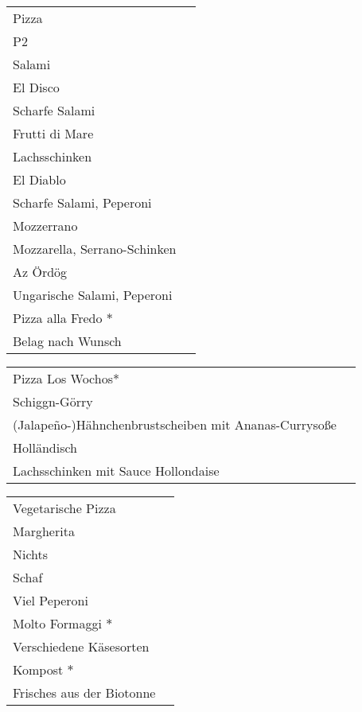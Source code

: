 \documentclass[12pt]{article}
\makeatletter
\newcommand*\ColText[1]{\textcolor{Goldenrod3}{#1}}
\newenvironment{Group}[1]
  {\noindent\begin{tabular*}{\textwidth}{@{}p{.8\linewidth}@{\extracolsep{\fill}}r@{}}
    {\fontsize{24}{29}\selectfont\ColText{#1}}\\[0.8em]}
  {\end{tabular*}}
\newcommand*\Entry[2]{%
  \sffamily#1 & #2}
\newcommand*\Expl[1]{%
  \hspace*{1em}\footnotesize #1}
\makeatother
\begin{document}
\vspace{1em}

\begin{Group}{Pizza}
\Entry{P2}{} \\
\Expl{Salami} \\
\Entry{El Disco}{} \\
\Expl{Scharfe Salami} \\
\Entry{Frutti di Mare}{} \\
\Expl{Lachsschinken} \\
\Entry{El Diablo}{} \\
\Expl{Scharfe Salami, Peperoni} \\
\Entry{Mozzerrano}{} \\
\Expl{Mozzarella, Serrano-Schinken} \\
\Entry{Az Ördög}{} \\ 
\Expl{Ungarische Salami, Peperoni} \\
\Entry{Pizza alla Fredo $\ast$}{} \\
\Expl{Belag nach Wunsch} \\
\end{Group}

\vspace{1em}

\begin{Group}{Pizza Los Wochos*}
\Entry{Schiggn-Görry}{} \\
\Expl{(Jalape\~{n}o-)Hähnchenbrustscheiben mit Ananas-Currysoße} \\
\Entry{Holländisch}{} \\
\Expl{Lachsschinken mit Sauce Hollondaise} \\
\end{Group}

\vspace{1em}

\begin{Group}{Vegetarische Pizza}
\Entry{Margherita}{} \\ 
\Expl{Nichts} \\
\Entry{Schaf}{} \\ 
\Expl{Viel Peperoni} \\
\Entry{Molto Formaggi $\ast$}{} \\ 
\Expl{Verschiedene Käsesorten} \\
\Entry{Kompost $\ast$}{} \\ 
\Expl{Frisches aus der Biotonne} \\
\end{Group}
\end{document}
